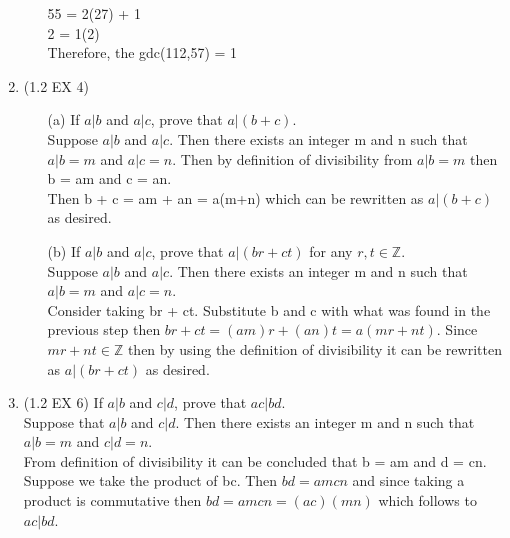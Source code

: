 \documentclass[12pt]{article}
\begin{document}
\begin{enumerate}
\begin{itemize}
        55 = 2(27) + 1 \\
        2 = 1(2) \\
        Therefore, the gdc(112,57) = 1
    \end{itemize}
    \item (1.2 EX 4) 
    \begin{itemize}
        \item[(a)] If $a|b$ and $a|c$, prove that $a|(b+c)$. \\
        Suppose $a|b$ and $a|c$. Then there exists an integer m and n such that $a|b = m$ and $a|c = n$. Then by definition of divisibility from $a|b = m$ then b = am and c = an. \\
        Then b + c = am + an = a(m+n) which can be rewritten as $a|(b+c)$ as desired. 
        \item[(b)] If $a|b$ and $a|c$, prove that $a|(br + ct)$ for any $r,t \in \mathbb{Z}$. \\
        Suppose $a|b$ and $a|c$. Then there exists an integer m and n such that $a|b = m$ and $a|c = n$. \\
        Consider taking br + ct. Substitute b and c with what was found in the previous step then $br + ct = (am)r + (an)t = a(mr+ nt)$. Since $mr + nt \in \mathbb{Z}$ then by using the definition of divisibility it can be rewritten as $a|(br + ct)$ as desired. 
    \end{itemize}
    \item (1.2 EX 6) If $a|b$ and $c|d$, prove that $ac|bd$. \\
    Suppose that $a|b$ and $c|d$. Then there exists an integer m and n such that $a|b = m$ and $c|d = n$. \\
    From definition of divisibility it can be concluded that b = am and d = cn. Suppose we take the product of bc. 
    Then $b d = a m c n $ and since taking a product is commutative then $b d = a m c n = (ac)(mn)$ which follows to $ac |bd$. \\
    
    
\end{enumerate}
\end{document}
